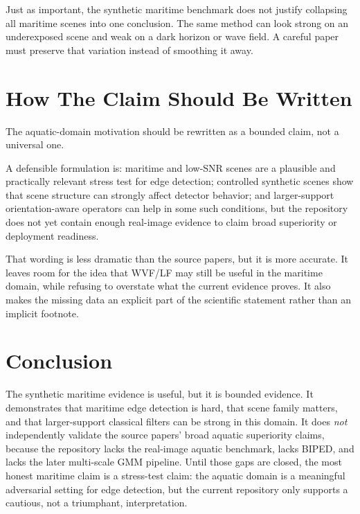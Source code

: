 \documentclass[conference]{IEEEtran}
\begin{document}
Just as important, the synthetic maritime benchmark does not justify collapsing all maritime scenes into one conclusion. The same method can look strong on an underexposed scene and weak on a dark horizon or wave field. A careful paper must preserve that variation instead of smoothing it away.

\section{How The Claim Should Be Written}
The aquatic-domain motivation should be rewritten as a bounded claim, not a universal one.

A defensible formulation is: maritime and low-SNR scenes are a plausible and practically relevant stress test for edge detection; controlled synthetic scenes show that scene structure can strongly affect detector behavior; and larger-support orientation-aware operators can help in some such conditions, but the repository does not yet contain enough real-image evidence to claim broad superiority or deployment readiness.

That wording is less dramatic than the source papers, but it is more accurate.
It leaves room for the idea that WVF/LF may still be useful in the maritime domain, while refusing to overstate what the current evidence proves. It also makes the missing data an explicit part of the scientific statement rather than an implicit footnote.

\section{Conclusion}
The synthetic maritime evidence is useful, but it is bounded evidence. It demonstrates that maritime edge detection is hard, that scene family matters, and that larger-support classical filters can be strong in this domain. It does \emph{not} independently validate the source papers' broad aquatic superiority claims, because the repository lacks the real-image aquatic benchmark, lacks BIPED, and lacks the later multi-scale GMM pipeline. Until those gaps are closed, the most honest maritime claim is a stress-test claim: the aquatic domain is a meaningful adversarial setting for edge detection, but the current repository only supports a cautious, not a triumphant, interpretation.
\end{document}
